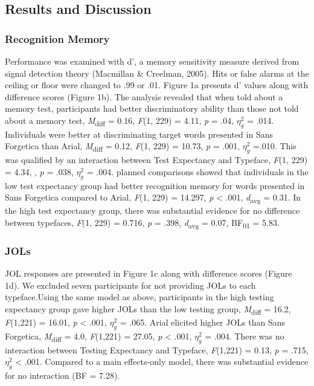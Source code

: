 \documentclass[
  english,
  jou]{apa7}
\begin{document}
\hypertarget{results-and-discussion}{%
\subsection{Results and Discussion}\label{results-and-discussion}}

\hypertarget{recognition-memory}{%
\subsubsection{Recognition Memory}\label{recognition-memory}}

Performance was examined with d', a memory sensitivity measure derived from signal detection theory (Macmillan \& Creelman, 2005). Hits or false alarms at the ceiling or floor were changed to .99 or .01. Figure 1a presents d' values along with difference scores (Figure 1b). The analysis revealed that when told about a memory test, participants had better discriminatory ability than those not told about a memory test, \emph{M}\textsubscript{diff} = 0.16, \emph{F}(1, 229) = 4.11, \emph{p} = .04, \(\eta_{g}^{2}\) = .014. Individuals were better at discriminating target words presented in Sans Forgetica than Arial, \emph{M}\textsubscript{diff} = 0.12, \emph{F}(1, 229) = 10.73, \emph{p} = .001, \(\eta_{g}^{2}\) =.010. This was qualified by an interaction between Test Expectancy and Typeface, \emph{F}(1, 229) = 4.34, , \emph{p} = .038, \(\eta_{g}^{2}\) = .004. planned comparisons showed that individuals in the low test expectancy group had better recognition memory for words presented in Sans Forgetica compared to Arial, \emph{F}(1, 229) = 14.297, \emph{p} \textless{} .001, \emph{d}\textsubscript{avg} = 0.31. In the high test expectancy group, there was substantial evidence for no difference between typefaces, \emph{F}(1, 229) = 0.716, \emph{p} = .398, \emph{d}\textsubscript{avg} = 0.07, BF\textsubscript{01} = 5.83.

\hypertarget{jols}{%
\subsubsection{JOLs}\label{jols}}

JOL responses are presented in Figure 1c along with difference scores (Figure 1d). We excluded seven participants for not providing JOLs to each typeface.Using the same model as above, participants in the high testing expectancy group gave higher JOLs than the low testing group, \emph{M}\textsubscript{diff} = 16.2, \emph{F}(1,221) = 16.01, \emph{p} \textless{} .001, \(\eta_{g}^{2}\) = .065. Arial elicited higher JOLs than Sans Forgetica, \emph{M}\textsubscript{diff} = 4.0, \emph{F}(1,221) = 27.05, \emph{p} \textless{} .001, \(\eta_{g}^{2}\) = .004. There was no interaction between Testing Expectancy and Typeface, \emph{F}(1,221) = 0.13, \emph{p} = .715, \(\eta_{g}^{2}\) \textless{} .001. Compared to a main effects-only model, there was substantial evidence for no interaction (BF = 7.28).
\end{document}
